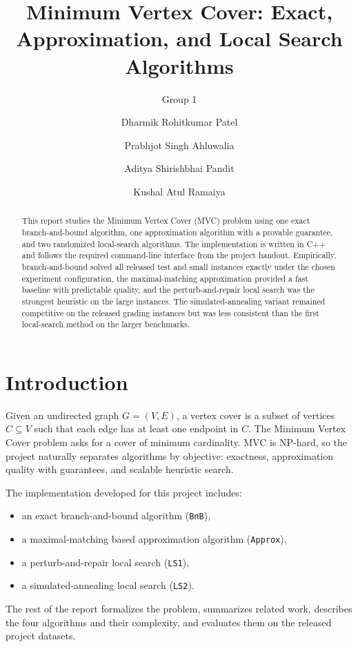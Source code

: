 \documentclass[sigconf,nonacm]{acmart}
\title{Minimum Vertex Cover: Exact, Approximation, and Local Search Algorithms}
\subtitle{Group 1}
\author{Dharmik Rohitkumar Patel}
\affiliation{%
  \institution{Georgia Institute of Technology}
  \city{Atlanta}
  \state{Georgia}
  \country{USA}
}
\author{Prabhjot Singh Ahluwalia}
\affiliation{%
  \institution{Georgia Institute of Technology}
  \city{Atlanta}
  \state{Georgia}
  \country{USA}
}
\author{Aditya Shirishbhai Pandit}
\affiliation{%
  \institution{Georgia Institute of Technology}
  \city{Atlanta}
  \state{Georgia}
  \country{USA}
}
\author{Kushal Atul Ramaiya}
\affiliation{%
  \institution{Georgia Institute of Technology}
  \city{Atlanta}
  \state{Georgia}
  \country{USA}
}
\begin{document}
\begin{abstract}
This report studies the Minimum Vertex Cover (MVC) problem using one exact branch-and-bound algorithm, one approximation algorithm with a provable guarantee, and two randomized local-search algorithms. The implementation is written in C++ and follows the required command-line interface from the project handout. Empirically, branch-and-bound solved all released test and small instances exactly under the chosen experiment configuration, the maximal-matching approximation provided a fast baseline with predictable quality, and the perturb-and-repair local search was the strongest heuristic on the large instances. The simulated-annealing variant remained competitive on the released grading instances but was less consistent than the first local-search method on the larger benchmarks.
\end{abstract}


\maketitle

\section{Introduction}
Given an undirected graph $G=(V,E)$, a vertex cover is a subset of vertices $C \subseteq V$ such that each edge has at least one endpoint in $C$. The Minimum Vertex Cover problem asks for a cover of minimum cardinality. MVC is NP-hard, so the project naturally separates algorithms by objective: exactness, approximation quality with guarantees, and scalable heuristic search.

The implementation developed for this project includes:
\begin{itemize}
\item an exact branch-and-bound algorithm (\texttt{BnB}),
\item a maximal-matching based approximation algorithm (\texttt{Approx}),
\item a perturb-and-repair local search (\texttt{LS1}),
\item a simulated-annealing local search (\texttt{LS2}).
\end{itemize}

The rest of the report formalizes the problem, summarizes related work, describes the four algorithms and their complexity, and evaluates them on the released project datasets.
\end{document}
